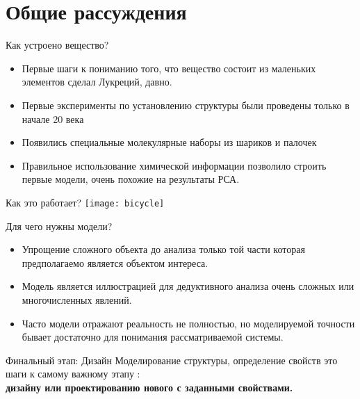 \section{Общие рассуждения}
\begin{frame}{Как устроено вещество?}
   \begin{itemize}
     \item Первые шаги к пониманию того, что вещество состоит из маленьких элементов сделал Лукреций, давно. 
    \vspace{0.2cm}
     \item Первые эксперименты по установлению структуры  были проведены только в начале 20 века
    \vspace{0.2cm}
     \item Появились специальные молекулярные наборы из шариков и палочек
    \vspace{0.2cm}
     \item Правильное использование химической информации позволило строить первые модели,
         очень похожие на результаты РСА.
    \end{itemize}
\end{frame}

\begin{frame}{Как это работает?}
    \centering
    \texttt{[image: bicycle]}
\end{frame}

\begin{frame}{Для чего нужны модели?}
  \begin{itemize}
   \item
Упрощение сложного объекта до анализа только той части которая предполагаемо является объектом интереса.\\
    \vspace{0.5cm}
   \item
Модель является иллюстрацией для дедуктивного анализа очень сложных или многочисленных явлений.\\
    \vspace{0.5cm}
   \item
Часто модели отражают  реальность не полностью, но моделируемой точности бывает достаточно для понимания рассматриваемой системы.
\end{itemize}
\end{frame}


\begin{frame}{Финальный этап: Дизайн}
    Моделирование структуры, определение свойств это шаги к самому важному этапу : \\
    \vspace{0.5cm}
    \textbf{
    дизайну или проектированию нового с заданными свойствами.}
\end{frame}

